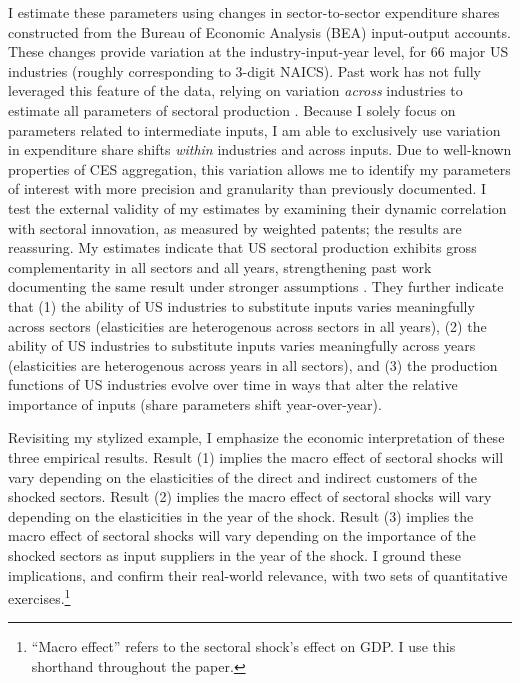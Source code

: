 \documentclass[11pt]{article}
\begin{document}
I estimate these parameters using changes in sector-to-sector expenditure shares constructed from the Bureau of Economic Analysis (BEA) input-output accounts. These changes provide variation at the industry-input-year level, for 66 major US industries (roughly corresponding to 3-digit NAICS). Past work has not fully leveraged this feature of the data, relying on variation \textit{across} industries to estimate all parameters of sectoral production \citep{atalayHowImportantAre2017}. Because I solely focus on parameters related to intermediate inputs, I am able to exclusively use variation in expenditure share shifts \textit{within} industries and across inputs. Due to well-known properties of CES aggregation, this variation allows me to identify my parameters of interest with more precision and granularity than previously documented. I test the external validity of my estimates by examining their dynamic correlation with sectoral innovation, as measured by weighted patents; the results are reassuring. My estimates indicate that US sectoral production exhibits gross complementarity in all sectors and all years, strengthening past work documenting the same result under stronger assumptions \citep{atalayHowImportantAre2017}. They further indicate that (1) the ability of US industries to substitute inputs varies meaningfully across sectors (elasticities are heterogenous across sectors in all years), (2) the ability of US industries to substitute inputs varies meaningfully across years (elasticities are heterogenous across years in all sectors), and (3) the production functions of US industries evolve over time in ways that alter the relative importance of inputs (share parameters shift year-over-year).

Revisiting my stylized example, I emphasize the economic interpretation of these three empirical results. Result (1) implies the macro effect of sectoral shocks will vary depending on the elasticities of the direct and indirect customers of the shocked sectors. Result (2) implies the macro effect of sectoral shocks will vary depending on the elasticities in the year of the shock. Result (3) implies the macro effect of sectoral shocks will vary depending on the importance of the shocked sectors as input suppliers in the year of the shock. I ground these implications, and confirm their real-world relevance, with two sets of quantitative exercises.\footnote{``Macro effect'' refers to the sectoral shock's effect on GDP. I use this shorthand throughout the paper.}  
\end{document}
